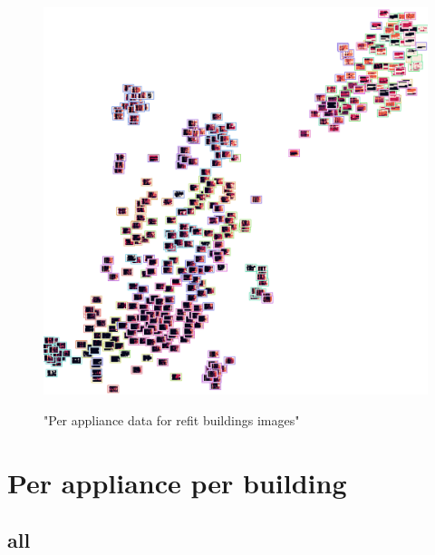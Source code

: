 \begin{figure}[H]
	\centering
	\caption{"Per appliance data for refit buildings images"}
	\includegraphics[width=.9\textwidth]{Figures/TSNE/TSNE_per_appliance/all/img_scatter_alltelevision.png}
	\label{fig:tsne_pa_img_scatter_all_tv}
\end{figure}

\section{Per appliance per building}

\subsection{all}

